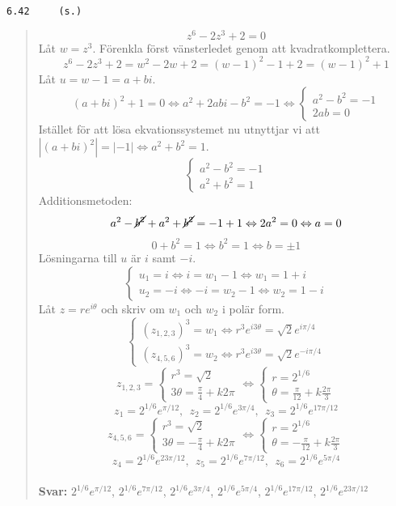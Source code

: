 \documentclass[a4paper]{article}
\newcommand{\tskcol}[1]{\textcolor{tskcol}{#1}}
\begin{document}
	\pagebreak
	\texttt{\tskcol{6.42~~~~ (s.)}}
	\begin{quotation}
		\noindent
		\[z^6-2z^3+2=0\]
		Låt $w=z^3$.
		Förenkla först vänsterledet genom att kvadratkomplettera.
		\[z^6-2z^3+2=w^2-2w+2=(w-1)^2-1+2=(w-1)^2+1\]
		Låt $u=w-1=a+bi$.
		\[(a+bi)^2+1=0 \Leftrightarrow
		a^2+2abi-b^2=-1\Leftrightarrow
		\begin{cases}
		a^2-b^2=-1 \\
		2ab=0
		\end{cases}\]
		Istället för att lösa ekvationssystemet nu utnyttjar vi  att $|(a+bi)^2|=|-1| \Leftrightarrow a^2+b^2=1$.
		\[\begin{cases}
		a^2-b^2 = -1 \\
		a^2+b^2 = 1
		\end{cases}\]
		Additionsmetoden:
		\[a^2-\cancel{b^2}+a^2+\cancel{b^2} = -1+1 \Leftrightarrow
		2a^2=0 \Leftrightarrow
		a=0\]
		\[0+b^2=1 \Leftrightarrow
		b^2=1 \Leftrightarrow
		b=\pm 1\]
		Lösningarna till $u$ är $i$ samt $-i$.
		\[\begin{cases}
		u_1=i \Leftrightarrow i=w_1-1 \Leftrightarrow w_1=1+i \\
		u_2=-i \Leftrightarrow -i=w_2-1 \Leftrightarrow w_2=1-i
		\end{cases}\]
		Låt $z=re^{i\theta}$ och skriv om $w_1$ och $w_2$ i polär form.
		\[\begin{cases}
		(z_{1,2,3})^3=w_1 \Leftrightarrow r^3e^{i3\theta}=\sqrt{2}e^{i\pi/4} \\
		(z_{4,5,6})^3=w_2 \Leftrightarrow r^3e^{i3\theta}=\sqrt{2}e^{-i\pi/4}
		\end{cases}\]
		\[z_{1,2,3}=
		\begin{cases}
		r^3=\sqrt{2} \\
		3\theta=\frac{\pi}{4}+k2\pi
		\end{cases} \Leftrightarrow
		\begin{cases}
		r=2^{1/6} \\
		\theta=\frac{\pi}{12}+k\frac{2\pi}{3}
		\end{cases}\]
		\[z_1=2^{1/6}e^{\pi/12},~~
		z_2=2^{1/6}e^{3\pi/4},~~
		z_3=2^{1/6}e^{17\pi/12}\]
		\[z_{4,5,6}=
		\begin{cases}
		r^3=\sqrt{2} \\
		3\theta=-\frac{\pi}{4}+k2\pi
		\end{cases} \Leftrightarrow
		\begin{cases}
		r=2^{1/6} \\
		\theta=-\frac{\pi}{12}+k\frac{2\pi}{3}
		\end{cases}\]
		\[z_4=2^{1/6}e^{23\pi/12},~~
		z_5=2^{1/6}e^{7\pi/12},~~
		z_6=2^{1/6}e^{5\pi/4}\]
		\\
		\textbf{Svar:} $2^{1/6}e^{\pi/12}$, $2^{1/6}e^{7\pi/12}$, $2^{1/6}e^{3\pi/4}$, $2^{1/6}e^{5\pi/4}$, $2^{1/6}e^{17\pi/12}$, $2^{1/6}e^{23\pi/12}$
	\end{quotation}
	
\end{document}

